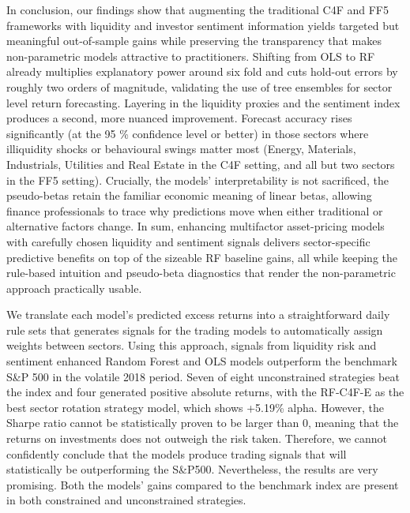 
In conclusion, our findings show that augmenting the traditional C4F and FF5 frameworks with liquidity and investor sentiment information yields targeted but meaningful out-of-sample gains while preserving the transparency that makes non-parametric models attractive to practitioners. Shifting from OLS to RF already multiplies explanatory power around six fold and cuts hold-out errors by roughly two orders of magnitude, validating the use of tree ensembles for sector level return forecasting. Layering in the liquidity proxies and the sentiment index produces a second, more nuanced improvement. Forecast accuracy rises significantly (at the 95 \% confidence level or better) in those sectors where illiquidity shocks or behavioural swings matter most (Energy, Materials, Industrials, Utilities and Real Estate in the C4F setting, and all but two sectors in the FF5 setting). Crucially, the models' interpretability is not sacrificed, the pseudo-betas retain the familiar economic meaning of linear betas, allowing finance professionals to trace why predictions move when either traditional or alternative factors change. In sum, enhancing multifactor asset-pricing models with carefully chosen liquidity and sentiment signals delivers sector-specific predictive benefits on top of the sizeable RF baseline gains, all while keeping the rule-based intuition and pseudo-beta diagnostics that render the non-parametric approach practically usable.

We translate each model's predicted excess returns into a straightforward daily rule sets that generates signals for the trading models to automatically assign weights between sectors. Using this approach, signals from liquidity risk and sentiment enhanced Random Forest and OLS models outperform the benchmark S\&P 500 in the volatile 2018 period. Seven of eight unconstrained strategies beat the index and four generated positive absolute returns, with the RF-C4F-E as the best sector rotation strategy model, which shows +5.19\% alpha. However, the Sharpe ratio cannot be statistically proven to be larger than 0, meaning that the returns on investments does not outweigh the risk taken. Therefore, we cannot confidently conclude that the models produce trading signals that will statistically be outperforming the S\&P500. Nevertheless, the results are very promising. Both the models' gains compared to the benchmark index are present in both constrained and unconstrained strategies. 


